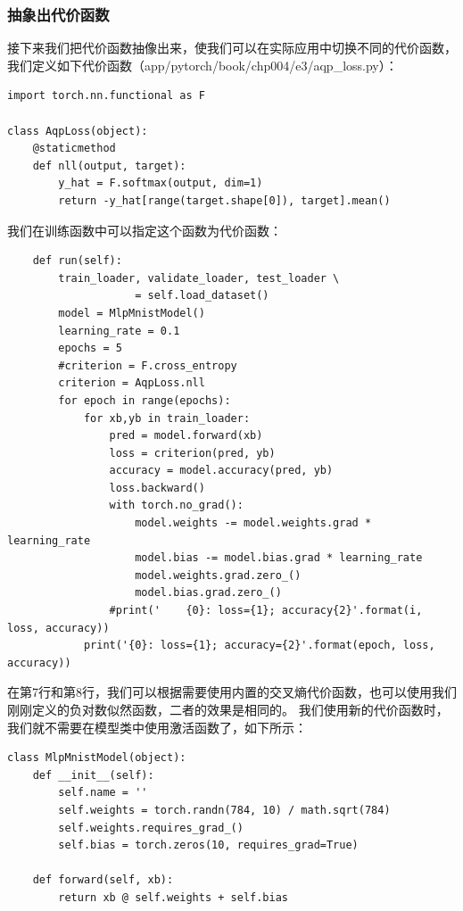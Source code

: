 \documentclass[UTF8]{article}
\begin{document}
\subsubsection{抽象出代价函数}
接下来我们把代价函数抽像出来，使我们可以在实际应用中切换不同的代价函数，我们定义如下代价函数（app/pytorch/book/chp004/e3/aqp\_loss.py）：
\begin{lstlisting}
import torch.nn.functional as F

class AqpLoss(object):
    @staticmethod
    def nll(output, target):
        y_hat = F.softmax(output, dim=1)
        return -y_hat[range(target.shape[0]), target].mean()
\end{lstlisting}
我们在训练函数中可以指定这个函数为代价函数：
\begin{lstlisting}
    def run(self):
        train_loader, validate_loader, test_loader \
                    = self.load_dataset()
        model = MlpMnistModel()
        learning_rate = 0.1
        epochs = 5
        #criterion = F.cross_entropy
        criterion = AqpLoss.nll
        for epoch in range(epochs):
            for xb,yb in train_loader:
                pred = model.forward(xb)
                loss = criterion(pred, yb)
                accuracy = model.accuracy(pred, yb)
                loss.backward()
                with torch.no_grad():
                    model.weights -= model.weights.grad * learning_rate
                    model.bias -= model.bias.grad * learning_rate
                    model.weights.grad.zero_()
                    model.bias.grad.zero_()
                #print('    {0}: loss={1}; accuracy{2}'.format(i, loss, accuracy))
            print('{0}: loss={1}; accuracy={2}'.format(epoch, loss, accuracy))
\end{lstlisting}
在第7行和第8行，我们可以根据需要使用内置的交叉熵代价函数，也可以使用我们刚刚定义的负对数似然函数，二者的效果是相同的。\newline
我们使用新的代价函数时，我们就不需要在模型类中使用激活函数了，如下所示：
\begin{lstlisting}
class MlpMnistModel(object):
    def __init__(self):
        self.name = ''
        self.weights = torch.randn(784, 10) / math.sqrt(784)
        self.weights.requires_grad_()
        self.bias = torch.zeros(10, requires_grad=True)
        
    def forward(self, xb):
        return xb @ self.weights + self.bias
\end{lstlisting}
\end{document}
